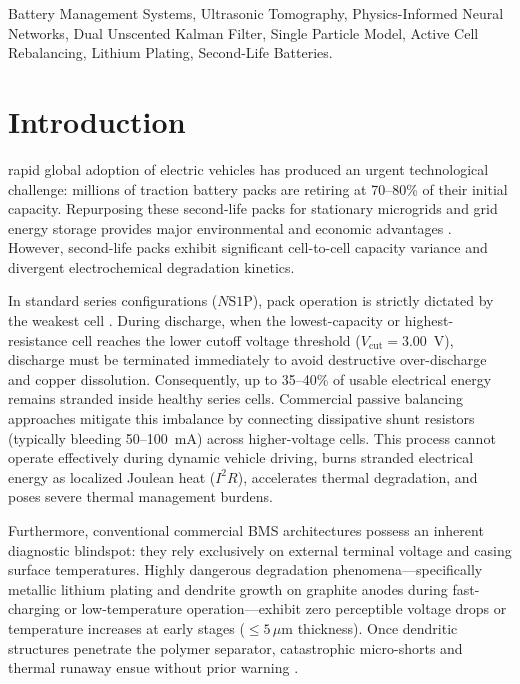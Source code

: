 \documentclass[journal]{IEEEtran}
\begin{document}
\begin{IEEEkeywords}
Battery Management Systems, Ultrasonic Tomography, Physics-Informed Neural Networks, Dual Unscented Kalman Filter, Single Particle Model, Active Cell Rebalancing, Lithium Plating, Second-Life Batteries.
\end{IEEEkeywords}

\section{Introduction}
 rapid global adoption of electric vehicles has produced an urgent technological challenge: millions of traction battery packs are retiring at 70--80\% of their initial capacity. Repurposing these second-life packs for stationary microgrids and grid energy storage provides major environmental and economic advantages \cite{ciez2019examining}. However, second-life packs exhibit significant cell-to-cell capacity variance and divergent electrochemical degradation kinetics.

In standard series configurations ($N$S$1$P), pack operation is strictly dictated by the weakest cell \cite{plett2015battery}. During discharge, when the lowest-capacity or highest-resistance cell reaches the lower cutoff voltage threshold ($V_{\text{cut}} = 3.00$~V), discharge must be terminated immediately to avoid destructive over-discharge and copper dissolution. Consequently, up to 35--40\% of usable electrical energy remains stranded inside healthy series cells. Commercial passive balancing approaches mitigate this imbalance by connecting dissipative shunt resistors (typically bleeding 50--100~mA) across higher-voltage cells. This process cannot operate effectively during dynamic vehicle driving, burns stranded electrical energy as localized Joulean heat ($I^2 R$), accelerates thermal degradation, and poses severe thermal management burdens.

Furthermore, conventional commercial BMS architectures possess an inherent diagnostic blindspot: they rely exclusively on external terminal voltage and casing surface temperatures. Highly dangerous degradation phenomena—specifically metallic lithium plating and dendrite growth on graphite anodes during fast-charging or low-temperature operation—exhibit zero perceptible voltage drops or temperature increases at early stages ($\le 5\,\mu\text{m}$ thickness). Once dendritic structures penetrate the polymer separator, catastrophic micro-shorts and thermal runaway ensue without prior warning \cite{hsieh2015electrochemical}.
\end{document}
